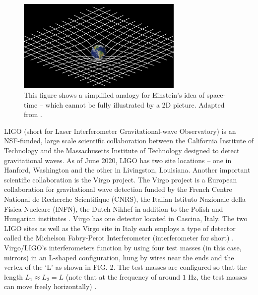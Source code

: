 \documentclass[preprint,
letterpaper,
 amsmath,amssymb,
 aps,
]{revtex4-2}
\begin{document}
\begin{figure}[t]
\includegraphics[width=8cm]{genral.png}
\caption{This figure shows a simplified analogy for Einstein's idea of space-time – which cannot be fully illustrated by a 2D picture. Adapted from \cite{mattson}.}
\centering
\end{figure}

LIGO (short for Laser Interferometer Gravitational-wave Observatory) is an NSF-funded, large scale scientific collaboration between the California Institute of Technology and the Massachusetts Institute of Technology designed to detect gravitational waves. As of June 2020, LIGO has two site locations – one in Hanford, Washington and the other in Livingston, Louisiana. Another important scientific collaboration is the Virgo project. The Virgo project is a European collaboration for gravitational wave detection funded by the French Centre National de Recherche Scientifique (CNRS), the Italian Istituto Nazionale della Fisica Nucleare (INFN), the Dutch Nikhef in addition to the Polish and Hungarian institutes \cite{collaboration2019open}. Virgo has one detector located in Cascina, Italy. The two LIGO sites as well as the Virgo site in Italy each employs a type of detector called the Michelson Fabry-Perot Interferometer (interferometer for short) \cite{creighton_anderson_2011}. Virgo/LIGO's interferometers function by using four test masses (in this case, mirrors) in an L-shaped configuration, hung by wires near the ends and the vertex of the `L' as shown in FIG. 2. The test masses are configured so that the length $L_1 \approx L_2 = L$ (note that at the frequency of around $1$ Hz, the test masses can move freely horizontally) \cite{JSTORLIGO}. 
\end{document}
